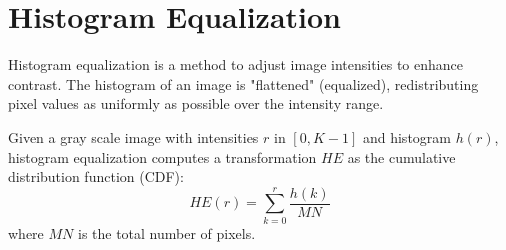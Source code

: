 \section{Histogram Equalization}

Histogram equalization is a method to adjust image intensities to enhance contrast. The histogram of an image is "flattened" (equalized), redistributing pixel values as uniformly as possible over the intensity range.


\noindent Given a gray scale image with intensities $r$ in $[0, K-1]$ and histogram $h(r)$, histogram equalization computes a transformation $HE$ as the cumulative distribution function (CDF):
$$
HE(r) = \sum_{k=0}^{r} \frac{h(k)}{MN}
$$
where $MN$ is the total number of pixels.

